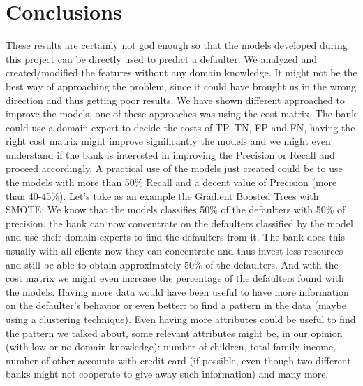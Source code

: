 \documentclass[fleqn,10pt]{SelfArx} %
\begin{document}
\section{Conclusions}
These results are certainly not god enough so that the models developed during this project can be directly used to predict a defaulter. 
We analyzed and created/modified the features without any domain knowledge. 
It might not be the best way of approaching the problem, since it could have brought us in the wrong direction and thus getting poor results.\newline
We have shown different approached to improve the models, one of these approaches was using the cost matrix. The bank could use a domain expert to decide the costs of TP, TN, FP and FN, having the right cost matrix might improve significantly the models and we might even understand if the bank is interested in improving the Precision or Recall and proceed accordingly.\newline
A practical use of the models just created could be to use the models with more than 50\% Recall and a decent value of Precision (more than 40-45\%). 
Let's take as an example the Gradient Boosted Trees with SMOTE: We know that the models classifies 50\% of the defaulters with 50\% of precision, the bank can now concentrate on the defaulters classified by the model and use their domain experts to find the defaulters from it. 
The bank does this usually with all clients now they can concentrate and thus invest less resources and still be able to obtain approximately 50\% of the defaulters.
And with the cost matrix we might even increase the percentage of the defaulters found with the models.\newline
Having more data would have been useful to have more information on the defaulter's behavior or even better: to find a pattern in the data (maybe using a clustering technique). Even having more attributes could be useful to find the pattern we talked about, some relevant attributes might be, in our opinion (with low or no domain knowledge): number of children, total family income, number of other accounts with credit card (if possible, even though two different banks might not cooperate to give away such information) and many more.


\end{document}
